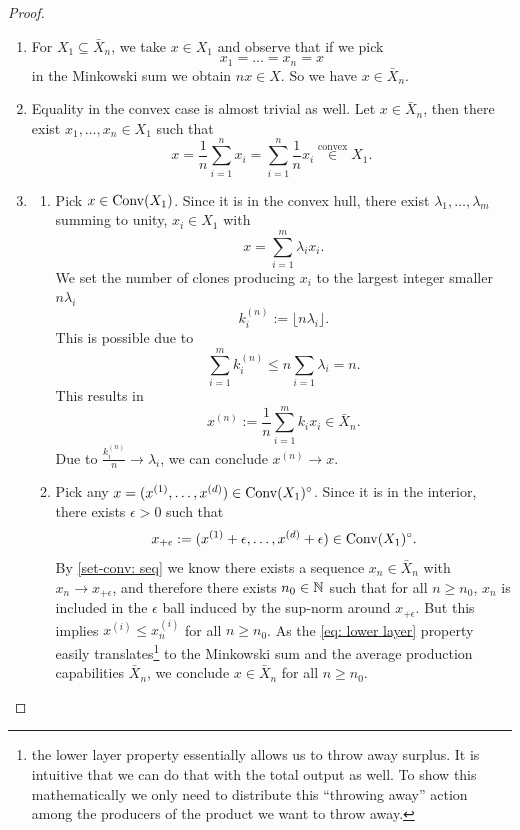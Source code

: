 \begin{proof}
\begin{enumerate}
	\item For \(X_1 \subseteq \bar{X}_n\), we take \(x\in X_1\) and
	observe that if we pick 
	\[
		x_1=\dots=x_n=x
	\]
	in the Minkowski sum we obtain \(n x \in X\). So we have
	\(x\in\bar{X}_n\).
	

	\item
	Equality in the convex case is almost trivial as well. Let \(x\in
	\bar{X}_n\), then there exist \(x_1,\dots,x_n \in X_1\) such that \[
		x = \frac1n \sum_{i=1}^n x_i = \sum_{i=1}^n \frac1n x_i
		\overset{\text{convex}}\in X_1.
	\]

	\item
	\begin{enumerate}
		\item Pick \(x\in \operatorname{Conv}(X_1)\). Since it is in the convex hull,
		there exist \(\lambda_1,\dots,\lambda_m\) summing to unity, \(x_i\in X_1\)
		with
		\[
			x = \sum_{i=1}^m \lambda_i x_i.
		\]
		We set the number of clones producing \(x_i\) to the largest integer smaller
		\(n\lambda_i\)
		\[
			k_i^{(n)} := \lfloor n\lambda_i \rfloor.
		\]
		This is possible due to	
		\[
			\sum_{i=1}^m k_i^{(n)} \le n \sum_{i=1} \lambda_i = n.
		\]
		This results in
		\[
			x^{(n)}:= \frac1n\sum_{i=1}^m k_i x_i \in \bar{X}_n.
		\]
		Due to \(\frac{k_i^{(n)}}{n}\to \lambda_i\), we can conclude \(x^{(n)}\to
		x\).
		
		\item
		Pick any \(x=(x^{(1)},\dots,x^{(d)})\in\operatorname{Conv}(X_1)^\circ\). Since it is
		in the interior, there exists \(\epsilon>0\) such that
		\[
			x_{+\epsilon}
			:= (x^{(1)}+\epsilon, \dots, x^{(d)}+\epsilon) \in \operatorname{Conv}(X_1)^\circ.
		\]
		By \ref{set-conv: seq} we know there exists a sequence
		\(x_n\in\bar{X}_n\) with \(x_n\to x_{+\epsilon}\), and therefore there exists
		\(n_0\in\mathbb{N}\) such that for all \(n\ge n_0\), \(x_n\) is included in the
		\(\epsilon\) ball induced by the sup-norm around \(x_{+\epsilon}\). But this
		implies \(x^{(i)} \le x^{(i)}_n\) for all \(n\ge n_0\). As the \ref{eq: lower
		layer} property easily translates\footnote{
			the lower layer property essentially allows us to throw away surplus. It
			is intuitive that we can do that with the total output as well. To show
			this mathematically we only need to distribute this ``throwing away''
			action among the producers of the product we want to throw away.
		} to the
		Minkowski sum and the average production capabilities \(\bar{X}_n\), we
		conclude \(x\in\bar{X}_n\) for all \(n\ge n_0\).
		\qedhere
	\end{enumerate}
\end{enumerate}
\end{proof}

